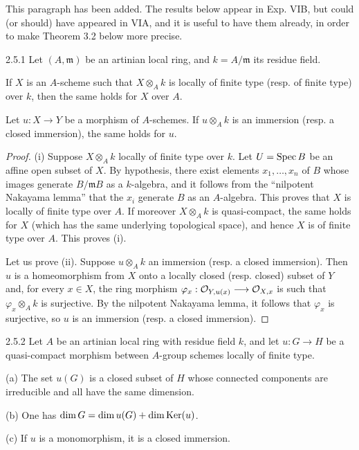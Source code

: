 This paragraph has been added. The results below appear in Exp. VIB, but could (or should) have appeared in VIA, and it is useful to have them already, in order to make Theorem 3.2 below more precise.
\begin{lemma}{2.5.1}\label{VIA.2.5.1}
Let $(A,\mathfrak m)$ be an artinian local ring, and $k=A/\mathfrak m$ its residue field.
\begin{enumeratei}
\item If $X$ is an $A$-scheme such that $X\otimes_Ak$ is locally of finite type (resp. of finite type) over $k$, then the same holds for $X$ over $A$.
\item Let $u:X\to Y$ be a morphism of $A$-schemes. If $u\otimes_Ak$ is an immersion (resp. a closed immersion), the same holds for $u$.
\end{enumeratei}
\end{lemma}
\begin{proof}
(i) Suppose $X\otimes_Ak$ locally of finite type over $k$. Let $U=\operatorname{Spec} B$ be an affine open subset of $X$. By hypothesis, there exist elements $x_1,\ldots,x_n$ of $B$ whose images generate $B/\mathfrak mB$ as a $k$-algebra, and it follows from the ``nilpotent Nakayama lemma'' that the $x_i$ generate $B$ as an $A$-algebra. This proves that $X$ is locally of finite type over $A$. If moreover $X\otimes_Ak$ is quasi-compact, the same holds for $X$ (which has the same underlying topological space), and hence $X$ is of finite type over $A$. This proves (i).

Let us prove (ii). Suppose $u\otimes_Ak$ an immersion (resp. a closed immersion). Then $u$ is a homeomorphism from $X$ onto a locally closed (resp. closed) subset of $Y$ and, for every $x\in X$, the ring morphism $\varphi_x:\mathcal{O}_{Y,u(x)}\longrightarrow\mathcal{O}_{X,x}$ is such that $\varphi_x\otimes_Ak$ is surjective. By the nilpotent Nakayama lemma, it follows that $\varphi_x$ is surjective, so $u$ is an immersion (resp. a closed immersion).
\end{proof}
\begin{proposition}{2.5.2}\label{VIA.2.5.2}
Let $A$ be an artinian local ring with residue field $k$, and let $u:G\to H$ be a quasi-compact morphism between $A$-group schemes locally of finite type.

\textup{(a)} The set $u(G)$ is a closed subset of $H$ whose connected components are irreducible and all have the same dimension.

\textup{(b)} One has $\dim G=\dim u(G)+\dim\operatorname{Ker}(u)$.

\textup{(c)} If $u$ is a monomorphism, it is a closed immersion.
\end{proposition}
